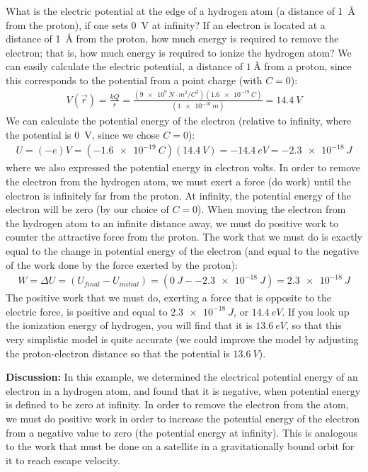 \begin{example}{What is the electric potential at the edge of a hydrogen atom (a distance of \SI{1}{\angstrom} from the proton), if one sets \SI{0}{V} at infinity? If an electron is located at a distance of \SI{1}{\angstrom} from the proton, how much energy is required to remove the electron; that is, how much energy is required to ionize the hydrogen atom?}
We can easily calculate the electric potential, a distance of $\SI{1}{\angstrom}$ from a proton, since this corresponds to the potential from a point charge (with $C=0$):
\begin{align*}
V(\vec r)=\frac{kQ}{r}=\frac{(\SI{9e9}{N\cdot m^2/C^{2}})(\SI{1.6e-19}{C})}{(\SI{1e-10}{m})}=\SI{14.4}{V}
\end{align*}
We can calculate the potential energy of the electron (relative to infinity, where the potential is \SI{0}{V}, since we chose $C=0$):
\begin{align*}
U=(-e)V=(\SI{-1.6e-19}{C})(\SI{14.4}{V})=-\SI{14.4}{eV}=\SI{-2.3e-18}{J}
\end{align*}
where we also expressed the potential energy in electron volts. In order to remove the electron from the hydrogen atom, we must exert a force (do work) until the electron is infinitely far from the proton. At infinity, the potential energy of the electron will be zero (by our choice of $C=0$). When moving the electron from the hydrogen atom to an infinite distance away, we must do positive work to counter the attractive force from the proton. The work that we must do is exactly equal to the change in potential energy of the electron (and equal to the negative of the work done by the force exerted by the proton):
\begin{align*}
W=\Delta U=(U_{final}-U_{initial})=(\SI{0}{J}-\SI{-2.3e-18}{J})=\SI{2.3e-18}{J}
\end{align*}
The positive work that we must do, exerting a force that is opposite to the electric force, is positive and equal to $\SI{2.3e-18}{J}$, or $\SI{14.4}{eV}$. If you look up the ionization energy of hydrogen, you will find that it is $\SI{13.6}{eV}$, so that this very simplistic model is quite accurate (we could improve the model by adjusting the proton-electron distance so that the potential is $\SI{13.6}{V}$). 

\textbf{Discussion:} In this example, we determined the electrical potential energy of an electron in a hydrogen atom, and found that it is negative, when potential energy is defined to be zero at infinity. In order to remove the electron from the atom, we must do positive work in order to increase the potential energy of the electron from a negative value to zero (the potential energy at infinity). This is analogous to the work that must be done on a satellite in a gravitationally bound orbit for it to reach escape velocity.
\end{example}


